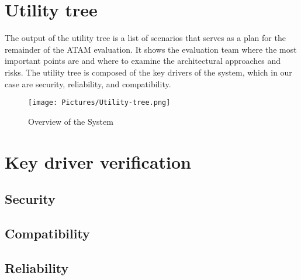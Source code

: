 \section{Utility tree}
The output of the utility tree is a list of scenarios that serves as a plan
for the remainder of the ATAM evaluation. It shows the evaluation team
where the most important points are and where to examine the architectural
approaches and risks. The utility tree is composed of the key drivers of the
system, which in our case are security, reliability, and compatibility.

\begin{figure}[H]
  \centering
  \texttt{[image: Pictures/Utility-tree.png]}
  \caption{Overview of the System}
  \label{fig:system}
\end{figure}

\section{Key driver verification}
\subsection{Security}
\subsection{Compatibility}
\subsection{Reliability}